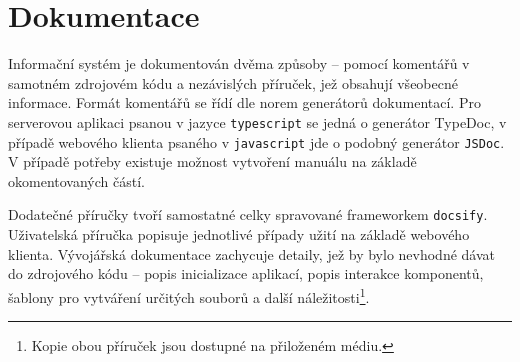 

\section{Dokumentace}

Informační systém je dokumentován dvěma způsoby -- pomocí komentářů v samotném zdrojovém kódu a nezávislých příruček, jež obsahují všeobecné informace. Formát komentářů se řídí dle norem generátorů dokumentací. Pro serverovou aplikaci psanou v jazyce \texttt{typescript} se jedná o generátor TypeDoc, v případě webového klienta psaného v \texttt{javascript} jde o podobný generátor \texttt{JSDoc}. V případě potřeby existuje možnost vytvoření manuálu na základě okomentovaných částí.

Dodatečné příručky tvoří samostatné celky spravované frameworkem \texttt{docsify}. Uživatelská příručka popisuje jednotlivé případy užití na základě webového klienta. Vývojářská dokumentace zachycuje detaily, jež by bylo nevhodné dávat do zdrojového kódu -- popis inicializace aplikací, popis interakce komponentů, šablony pro vytváření určitých souborů a další náležitosti\footnote{Kopie obou příruček jsou dostupné na přiloženém médiu.}.
